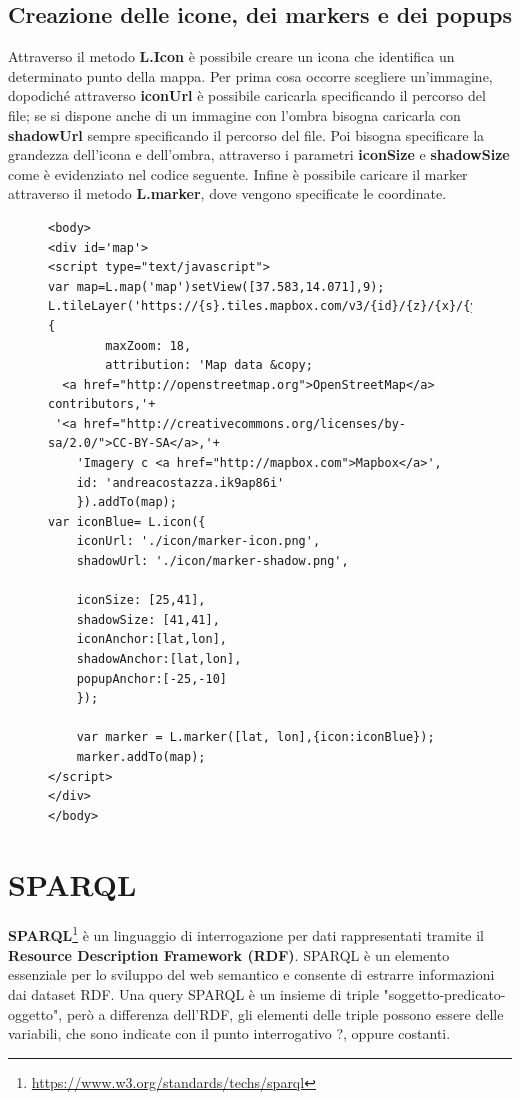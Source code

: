 \documentclass[a4paper,11pt]{article}
\begin{document}
\subsection{Creazione delle icone, dei markers e dei popups}
\label{sec:3.2}
Attraverso il metodo \textbf{L.Icon} è possibile creare un icona che identifica un determinato punto della mappa. Per prima cosa occorre scegliere un'immagine, dopodiché attraverso \textbf{iconUrl} è possibile caricarla specificando il percorso del file; se si dispone anche di un immagine con l'ombra bisogna caricarla con \textbf{shadowUrl} sempre specificando il percorso del file. Poi bisogna specificare la grandezza dell'icona e dell'ombra, attraverso i parametri \textbf{iconSize} e \textbf{shadowSize} come è evidenziato nel codice seguente. Infine è possibile caricare il marker attraverso il metodo \textbf{L.marker}, dove vengono specificate le coordinate.
\begin{figure}[htb]
\begin{lstlisting}[style=htmlcssjs]
<body>		
<div id='map'>
<script type="text/javascript">
var map=L.map('map')setView([37.583,14.071],9);
L.tileLayer('https://{s}.tiles.mapbox.com/v3/{id}/{z}/{x}/{y}.png',{
        maxZoom: 18,
        attribution: 'Map data &copy; 
  <a href="http://openstreetmap.org">OpenStreetMap</a> contributors,'+
 '<a href="http://creativecommons.org/licenses/by-sa/2.0/">CC-BY-SA</a>,'+
	'Imagery c <a href="http://mapbox.com">Mapbox</a>',
	id: 'andreacostazza.ik9ap86i'
	}).addTo(map);
var iconBlue= L.icon({
	iconUrl: './icon/marker-icon.png',
	shadowUrl: './icon/marker-shadow.png',
			
	iconSize: [25,41],
	shadowSize: [41,41],
	iconAnchor:[lat,lon],
	shadowAnchor:[lat,lon],
	popupAnchor:[-25,-10]
	});
	
	var marker = L.marker([lat, lon],{icon:iconBlue});		
	marker.addTo(map);
</script>
</div>
</body>
\end{lstlisting}
\end{figure}

\newpage

\section{SPARQL}
\label{sec:4}
\textbf{SPARQL}\footnote{\url{https://www.w3.org/standards/techs/sparql}} è un linguaggio di interrogazione per dati rappresentati tramite il \textbf{Resource Description Framework (RDF)}.
SPARQL è un elemento essenziale per lo sviluppo del web semantico e consente di estrarre informazioni dai dataset RDF.\newline 
Una query SPARQL è un insieme di triple "soggetto-predicato-oggetto", però a differenza dell'RDF, gli elementi delle triple possono essere delle variabili, che sono indicate con il punto interrogativo ?, oppure costanti.
\end{document}
